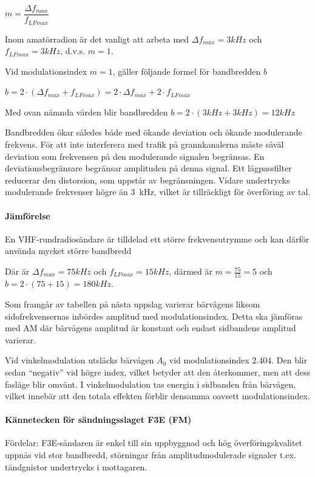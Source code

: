 \(m = \dfrac{\Delta f_{max}}{f_{LFmax}}\)

Inom amatörradion är det vanligt att arbeta med \(\Delta f_{max} = 3 kHz\) och
\(f_{LFmax} = 3 kHz\), d.v.s. \(m = 1\).

Vid modulationsindex \(m = 1\), gäller följande
formel för bandbredden \(b\)

\(b = 2 \cdot ( \Delta f_{max} + f_{LFmax}) = 2 \cdot \Delta f_{max}
 + 2 \cdot f_{LFmax}\)

Med ovan nämnda värden blir bandbredden \(b = 2 \cdot (3 kHz + 3 kHz)
 = 12 kHz\)

Bandbredden ökar således både med ökande deviation och ökande modulerande
frekvens. För att inte interferera med trafik på grannkanalerna måste såväl
deviation som frekvensen på den modulerande signalen begränsas. En
deviationsbegränsare begränsar amplituden på denna signal. Ett lågpassfilter
reducerar den distorsion, som uppstår av begränsningen. Vidare undertrycks
modulerande frekvenser högre än 3~kHz, vilket är tillräckligt för överföring
av tal.

\paragraph{Jämförelse}

En VHF-rundradiosändare är tilldelad ett större frekvensutrymme och kan därför
använda mycket större bandbredd

Där är \(\Delta f_{max} = 75 kHz\) och \(f_{LFmax} =15 kHz\), därmed är
\(m = \frac{75}{15} = 5\) och \(b = 2 \cdot (75 + 15) = 180 kHz\).

Som framgår av tabellen på nästa uppslag varierar bärvågens liksom
sidofrekvensernas inbördes amplitud med modulationsindex. Detta ska jämföras
med AM där bärvågens amplitud är konstant och endast sidbandens amplitud
varierar.

Vid vinkelmodulation utsläcks bärvågen \(A_0\) vid modulationsindex 2.404. Den
blir sedan ``negativ'' vid högre index, vilket betyder att den återkommer, men
att dess fasläge blir omvänt. I vinkelmodulation tas energin i sidbanden från
bärvågen, vilket innebär att den totala effekten förblir densamma oavsett
modulationsindex.

\paragraph{Kännetecken för sändningsslaget F3E (FM)}

Fördelar: F3E-sändaren är enkel till sin uppbyggnad och hög överföringskvalitet
uppnås vid stor bandbredd, störningar från amplitudmodulerade signaler t.ex.
tändgnistor undertrycks i mottagaren.


